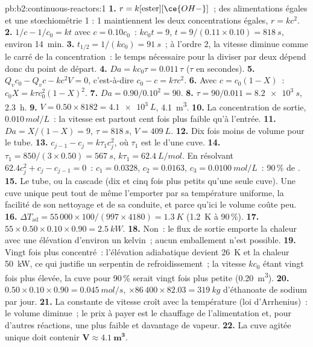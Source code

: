 \begin{solution}{pb:b2:continuous-reactors:1}
\textbf{1.} $r = k[\text{ester}][\ce{OH-}]$~; des alimentations égales et une
stœchiométrie 1 : 1 maintiennent les deux concentrations égales, $r = kc^2$.
\textbf{2.} $1/c - 1/c_0 = kt$ avec $c = 0.10c_0$~: $kc_0t = 9$, $t = 9/(0.11
\times 0.10) = \qty{818}{s}$, environ \qty{14}{min}.
\textbf{3.} $t_{1/2} = 1/(kc_0) = \qty{91}{s}$~; à l'ordre 2, la vitesse diminue comme
le carré de la concentration~: le temps nécessaire pour la diviser par deux dépend donc du point
de départ.
\textbf{4.} $Da = kc_0\tau = 0.011\,\tau$ ($\tau$ en secondes).
\textbf{5.} $Q_vc_0 - Q_vc - kc^2V = 0$, c'est-à-dire $c_0 - c = k\tau c^2$.
\textbf{6.} Avec $c = c_0(1 - X)$~: $c_0X = k\tau c_0^2(1 - X)^2$.
\textbf{7.} $Da = 0.90/0.10^2 = 90$.
\textbf{8.} $\tau = 90/0.011 = \qty{8.2e3}{s}$, \qty{2.3}{h}.
\textbf{9.} $V = 0.50 \times 8182 = \qty{4.1e3}{L}$, \qty{4.1}{m^3}.
\textbf{10.} La concentration de sortie, $0.010\,\unit{mol/L}$~: la vitesse est
partout cent fois plus faible qu'à l'entrée.
\textbf{11.} $Da = X/(1 - X) = 9$, $\tau = \qty{818}{s}$, $V = \qty{409}{L}$.
\textbf{12.} Dix fois moins de volume pour le tube.
\textbf{13.} $c_{j-1} - c_j = k\tau_1c_j^2$, où $\tau_1$ est le 
d'une cuve.
\textbf{14.} $\tau_1 = 850/(3 \times 0.50) = \qty{567}{s}$, $k\tau_1 =
\qty{62.4}{L/mol}$. En résolvant $62.4c_j^2 + c_j - c_{j-1} = 0$~: $c_1 = 0.0328$,
$c_2 = 0.0163$, $c_3 = \qty{0.0100}{mol/L}$~: 90\,\% de .
\textbf{15.} Le tube, ou la cascade (dix et cinq fois plus petits qu'une seule
cuve). Une cuve unique peut tout de même l'emporter par sa température uniforme, la facilité
de son nettoyage et de sa conduite, et parce qu'ici le volume coûte peu.
\textbf{16.} $\Delta T_{\text{ad}} = 55\,000 \times 100/(997 \times 4180) =
\qty{1.3}{K}$ (\qty{1.2}{K} à 90\,\%).
\textbf{17.} $55 \times 0.50 \times 0.10 \times 0.90 = \qty{2.5}{kW}$.
\textbf{18.} Non~: le flux de sortie emporte la chaleur avec une élévation d'environ
un kelvin~; aucun emballement n'est possible.
\textbf{19.} Vingt fois plus concentré~: l'élévation adiabatique devient
\qty{26}{K} et la chaleur \qty{50}{kW}, ce qui justifie un serpentin de refroidissement~; la vitesse $kc_0$
étant vingt fois plus élevée, la cuve pour 90\,\% serait vingt fois plus petite
(\qty{0.20}{m^3}).
\textbf{20.} $0.50 \times 0.10 \times 0.90 = \qty{0.045}{mol/s}$, $\times 86\,400
\times 82.03 = \qty{319}{kg}$ d'éthanoate de sodium par jour.
\textbf{21.} La constante de vitesse croît avec la température (loi d'Arrhenius)~: le
volume diminue~; le prix à payer est le chauffage de l'alimentation et, pour d'autres
réactions, une  plus faible et davantage de vapeur.
\textbf{22.} La cuve agitée unique doit contenir $\boldsymbol{V \approx
\qty{4.1}{m^3}}$.
\end{solution}

